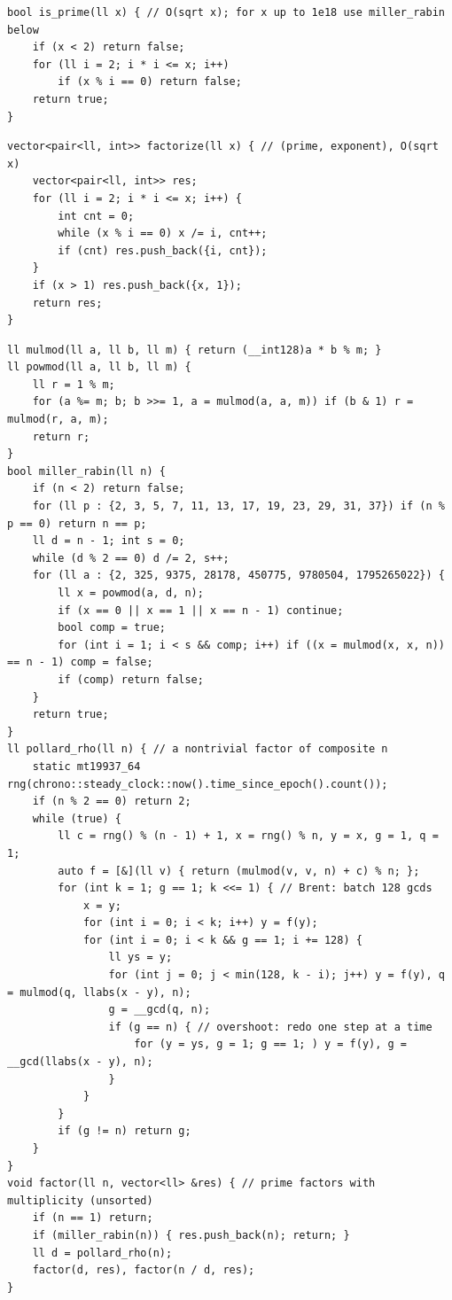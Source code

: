 \documentclass[8pt]{extarticle}
\begin{document}
\begin{multicols*}{3}
\begin{lstlisting}
bool is_prime(ll x) { // O(sqrt x); for x up to 1e18 use miller_rabin below
    if (x < 2) return false;
    for (ll i = 2; i * i <= x; i++)
        if (x % i == 0) return false;
    return true;
}
\end{lstlisting}

\begin{lstlisting}
vector<pair<ll, int>> factorize(ll x) { // (prime, exponent), O(sqrt x)
    vector<pair<ll, int>> res;
    for (ll i = 2; i * i <= x; i++) {
        int cnt = 0;
        while (x % i == 0) x /= i, cnt++;
        if (cnt) res.push_back({i, cnt});
    }
    if (x > 1) res.push_back({x, 1});
    return res;
}
\end{lstlisting}

\begin{lstlisting}
ll mulmod(ll a, ll b, ll m) { return (__int128)a * b % m; }
ll powmod(ll a, ll b, ll m) {
    ll r = 1 % m;
    for (a %= m; b; b >>= 1, a = mulmod(a, a, m)) if (b & 1) r = mulmod(r, a, m);
    return r;
}
bool miller_rabin(ll n) {
    if (n < 2) return false;
    for (ll p : {2, 3, 5, 7, 11, 13, 17, 19, 23, 29, 31, 37}) if (n % p == 0) return n == p;
    ll d = n - 1; int s = 0;
    while (d % 2 == 0) d /= 2, s++;
    for (ll a : {2, 325, 9375, 28178, 450775, 9780504, 1795265022}) {
        ll x = powmod(a, d, n);
        if (x == 0 || x == 1 || x == n - 1) continue;
        bool comp = true;
        for (int i = 1; i < s && comp; i++) if ((x = mulmod(x, x, n)) == n - 1) comp = false;
        if (comp) return false;
    }
    return true;
}
ll pollard_rho(ll n) { // a nontrivial factor of composite n
    static mt19937_64 rng(chrono::steady_clock::now().time_since_epoch().count());
    if (n % 2 == 0) return 2;
    while (true) {
        ll c = rng() % (n - 1) + 1, x = rng() % n, y = x, g = 1, q = 1;
        auto f = [&](ll v) { return (mulmod(v, v, n) + c) % n; };
        for (int k = 1; g == 1; k <<= 1) { // Brent: batch 128 gcds
            x = y;
            for (int i = 0; i < k; i++) y = f(y);
            for (int i = 0; i < k && g == 1; i += 128) {
                ll ys = y;
                for (int j = 0; j < min(128, k - i); j++) y = f(y), q = mulmod(q, llabs(x - y), n);
                g = __gcd(q, n);
                if (g == n) { // overshoot: redo one step at a time
                    for (y = ys, g = 1; g == 1; ) y = f(y), g = __gcd(llabs(x - y), n);
                }
            }
        }
        if (g != n) return g;
    }
}
void factor(ll n, vector<ll> &res) { // prime factors with multiplicity (unsorted)
    if (n == 1) return;
    if (miller_rabin(n)) { res.push_back(n); return; }
    ll d = pollard_rho(n);
    factor(d, res), factor(n / d, res);
}
\end{lstlisting}


\end{multicols*}
\end{document}
